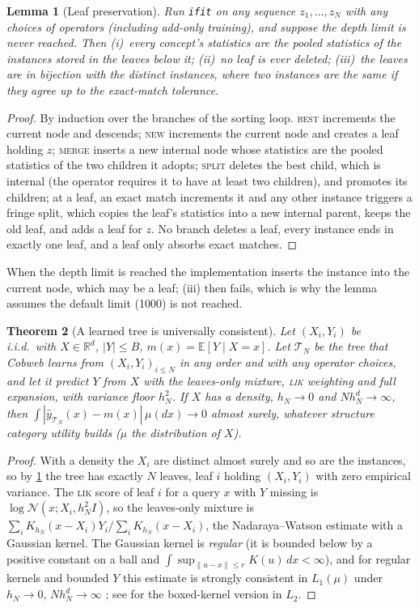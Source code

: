 \documentclass[11pt]{article}
\newtheorem{theorem}{Theorem}
\newtheorem{lemma}[theorem]{Lemma}
\theoremstyle{definition}
\theoremstyle{remark}
\newcommand{\R}{\mathbb{R}}
\newcommand{\E}{\mathbb{E}}
\newcommand{\N}{\mathcal{N}}
\newcommand{\T}{\mathcal{T}}
\newcommand{\hy}{\hat{y}}
\begin{document}
\begin{lemma}[Leaf preservation]\label{lem:leaves}
Run \texttt{ifit} on any sequence $z_1,\dots,z_N$ with any choices of operators
(including add-only training), and suppose the depth limit is never reached.  Then
(i)~every concept's statistics are the pooled statistics of the instances stored in the
leaves below it; (ii)~no leaf is ever deleted; (iii)~the leaves are in bijection with the distinct
instances, where two instances are the same if they agree up to the exact-match
tolerance.
\end{lemma}
\begin{proof}
By induction over the branches of the sorting loop.  \textsc{best} increments the
current node and descends; \textsc{new} increments the current node and creates a leaf
holding $z$; \textsc{merge} inserts a new internal node whose statistics are the pooled
statistics of the two children it adopts; \textsc{split} deletes the best child, which is
internal (the operator requires it to have at least two children), and promotes its
children; at a leaf, an exact match increments it and any other instance triggers a
fringe split, which copies the leaf's statistics into a new internal parent, keeps the
old leaf, and adds a leaf for $z$.  No branch deletes a leaf, every instance ends in
exactly one leaf, and a leaf only absorbs exact matches.
\end{proof}

When the depth limit is reached the implementation inserts the instance into the
current node, which may be a leaf; (iii) then fails, which is why the lemma assumes the
default limit (1000) is not reached.

\begin{theorem}[A learned tree is universally consistent]\label{thm:consistency}
Let $(X_i,Y_i)$ be i.i.d.\ with $X\in\R^d$, $|Y|\le B$, $m(x)=\E[Y\mid X=x]$.
Let $\T_N$ be the tree that Cobweb learns from $(X_i,Y_i)_{i\le N}$ in any order and with
any operator choices, and let it predict $Y$ from $X$ with the leaves-only mixture,
\textsc{lik} weighting and full expansion, with variance floor $h_N^2$.  If $X$ has a
density, $h_N\to0$ and $Nh_N^d\to\infty$, then
$\int|\hy_{\T_N}(x)-m(x)|\,\mu(dx)\to0$ almost surely, whatever structure category
utility builds ($\mu$ the distribution of $X$).
\end{theorem}
\begin{proof}
With a density the $X_i$ are distinct almost surely and so are the instances, so by
\cref{lem:leaves} the tree has exactly $N$ leaves, leaf $i$ holding $(X_i,Y_i)$ with zero
empirical variance.  The \textsc{lik} score of leaf $i$ for a query $x$ with $Y$
missing is $\log\N(x;X_i,h_N^2I)$, so the leaves-only mixture is
$\sum_iK_{h_N}(x-X_i)Y_i/\sum_iK_{h_N}(x-X_i)$, the Nadaraya--Watson estimate with
a Gaussian kernel.  The Gaussian kernel is \emph{regular} (it is bounded below by a
positive constant on a ball and $\int\sup_{\|u-x\|\le r}K(u)\,dx<\infty$), and for
regular kernels and bounded $Y$ this estimate is strongly consistent in $L_1(\mu)$
under $h_N\to0$, $Nh_N^d\to\infty$ \citep{devroye1989}; see \citet[Ch.~5]{gyorfi2002}
for the boxed-kernel version in $L_2$.
\end{proof}
\end{document}
